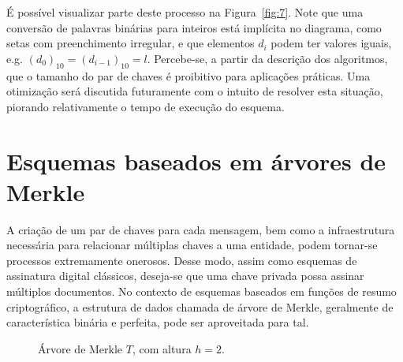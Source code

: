 \documentclass[12pt]{report}
\newcommand{\hash}[2][]{\mathcal{H}^{#1}(#2)}
\newcommand{\concat}{\, \vert \vert \,}
\begin{document}
É possível visualizar parte deste processo na Figura~\ref{fig:7}. Note que uma conversão de palavras binárias para inteiros está implícita no diagrama, como setas com preenchimento irregular, e que elementos $d_i$ podem ter valores iguais, e.g. $(d_{0})_{10} = (d_{i-1})_{10} = l$. Percebe-se, a partir da descrição dos algoritmos, que o tamanho do par de chaves é proibitivo para aplicações práticas. Uma otimização será discutida futuramente com o intuito de resolver esta situação, piorando relativamente o tempo de execução do esquema.

\section{Esquemas baseados em árvores de Merkle}

A criação de um par de chaves para cada mensagem, bem como a infraestrutura
necessária para relacionar múltiplas chaves a uma entidade, podem tornar-se
processos extremamente onerosos. Desse modo, assim como esquemas de assinatura
digital clássicos, deseja-se que uma chave privada possa assinar múltiplos
documentos. No contexto de esquemas baseados em funções de resumo
criptográfico, a estrutura de dados chamada de árvore de Merkle, geralmente de
característica binária e perfeita, pode ser aproveitada para tal.

\begin{figure}[ht]
  \centering
  \caption{Árvore de Merkle $T$, com altura $h = 2$.}
  \label{fig:4}
\end{figure}
\end{document}
